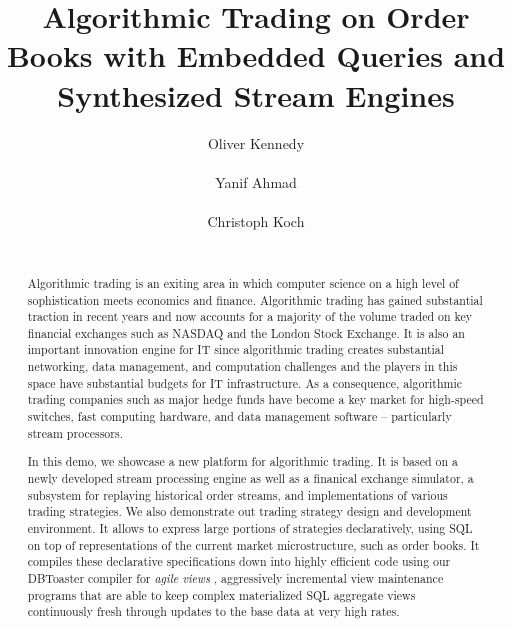 \documentclass{vldb}
\begin{document}
\title{Algorithmic Trading on Order Books with Embedded Queries and Synthesized
Stream Engines}
\author{
\alignauthor
Oliver Kennedy\\
\\
\alignauthor
Yanif Ahmad\\
\\
\alignauthor
Christoph Koch\\
\\
}
\maketitle

\begin{abstract}
Algorithmic trading is an exiting area in which computer science on a
high level of sophistication meets economics and finance. Algorithmic
trading has gained substantial traction in recent years and now accounts
for a majority of the volume traded on key financial exchanges such as
NASDAQ and the London Stock Exchange. It is also an important innovation
engine for IT since algorithmic trading creates substantial
networking, data management, and computation challenges and
the players in this
space have substantial budgets for IT infrastructure.
As a consequence, algorithmic trading companies such as major hedge funds have
become a key market for high-speed switches, fast computing hardware, and data
management software -- particularly stream processors.

In this demo, we showcase a new platform for algorithmic trading.
It is based on a newly developed stream processing engine
as well as a finanical exchange simulator, a subsystem for replaying
historical order streams, and implementations of various trading strategies.
We also demonstrate out trading strategy design and development environment.
It allows to express large portions of strategies declaratively, using SQL on
top of representations of the current
market microstructure, such as order books.
It compiles these declarative specifications down into highly efficient
code using our DBToaster compiler for {\em agile views} \cite{KAK2011},
aggressively incremental view maintenance programs that are able to
keep complex materialized SQL aggregate views continuously fresh through
updates to the base data at very high rates.
\end{abstract}
\end{document}
